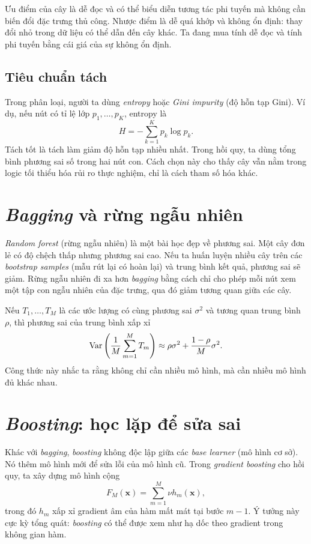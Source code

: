 Ưu điểm của cây là dễ đọc và có thể biểu diễn tương tác phi tuyến mà không cần biến đổi đặc trưng thủ công. Nhược điểm là dễ quá khớp và không ổn định: thay đổi nhỏ trong dữ liệu có thể dẫn đến cây khác. Ta đang mua tính dễ đọc và tính phi tuyến bằng cái giá của sự không ổn định.

\subsection{Tiêu chuẩn tách}

Trong phân loại, người ta dùng \emph{entropy} hoặc \emph{Gini impurity} (độ hỗn tạp Gini). Ví dụ, nếu nút có tỉ lệ lớp \(p_1,\dots,p_K\), entropy là
\[
H = -\sum_{k=1}^K p_k \log p_k.
\]
Tách tốt là tách làm giảm độ hỗn tạp nhiều nhất. Trong hồi quy, ta dùng tổng bình phương sai số trong hai nút con. Cách chọn này cho thấy cây vẫn nằm trong logic tối thiểu hóa rủi ro thực nghiệm, chỉ là cách tham số hóa khác.

\section{\emph{Bagging} và rừng ngẫu nhiên}

\emph{Random forest} (rừng ngẫu nhiên) là một bài học đẹp về phương sai. Một cây đơn lẻ có độ chệch thấp nhưng phương sai cao. Nếu ta huấn luyện nhiều cây trên các \emph{bootstrap samples} (mẫu rút lại có hoàn lại) và trung bình kết quả, phương sai sẽ giảm. Rừng ngẫu nhiên đi xa hơn \emph{bagging} bằng cách chỉ cho phép mỗi nút xem một tập con ngẫu nhiên của đặc trưng, qua đó giảm tương quan giữa các cây.

Nếu \(T_1,\dots,T_M\) là các ước lượng có cùng phương sai \(\sigma^2\) và tương quan trung bình \(\rho\), thì phương sai của trung bình xấp xỉ
\[
\mathrm{Var}\left(\frac{1}{M}\sum_{m=1}^M T_m\right)
\approx
\rho\sigma^2 + \frac{1-\rho}{M}\sigma^2.
\]
Công thức này nhắc ta rằng không chỉ cần nhiều mô hình, mà cần nhiều mô hình đủ khác nhau.

\section{\emph{Boosting}: học lặp để sửa sai}

Khác với \emph{bagging}, \emph{boosting} không độc lập giữa các \emph{base learner} (mô hình cơ sở). Nó thêm mô hình mới để sửa lỗi của mô hình cũ. Trong \emph{gradient boosting} cho hồi quy, ta xây dựng mô hình cộng
\[
F_M(\bm{x})=\sum_{m=1}^M \nu h_m(\bm{x}),
\]
trong đó \(h_m\) xấp xỉ gradient âm của hàm mất mát tại bước \(m-1\). Ý tưởng này cực kỳ tổng quát: \emph{boosting} có thể được xem như hạ dốc theo gradient trong không gian hàm.

